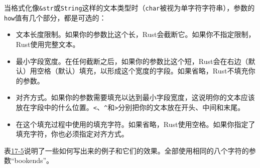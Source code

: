 当格式化像\texttt{\&str}或\texttt{String}这样的文本类型时（\texttt{char}被视为单字符字符串），参数的\texttt{how}值有几个部分，都是可选的：
\begin{itemize}
    \item 文本长度限制。如果你的参数比这个长，Rust会截断它。如果你不指定限制，Rust使用完整文本。
    \item 最小字段宽度。在任何截断之后，如果你的参数比这个短，Rust会在右边（默认）用空格（默认）填充，以形成这个宽度的字段。如果省略，Rust不填充你的参数。
    \item 对齐方式。如果你的参数需要填充以达到最小字段宽度，这说明你的文本应该放在字段中的什么位置。\texttt{<}、\texttt{\^{}}和\texttt{>}分别把你的文本放在开头、中间和末尾。
    \item 在这个填充过程中使用的填充字符。如果省略，Rust使用空格。如果你指定了填充字符，你也必须指定对齐方式。
\end{itemize}

表\hyperref[t17-5]{17-5}说明了一些如何写出来的例子和它们的效果。全部使用相同的八个字符的参数“bookends”。

